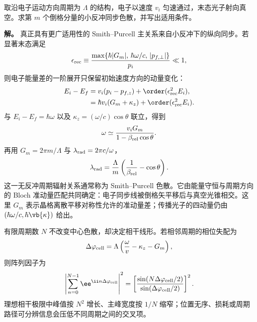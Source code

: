 \begin{exbox}
取沿电子运动方向周期为 $\Lambda$ 的结构，电子以速度 $v_i$ 匀速通过，末态光子射向真空。求第 $m$ 个倒格分量的小反冲同步色散，并写出适用条件。

\textbf{解。} 真正具有更广适用性的 Smith--Purcell 主关系来自小反冲下的纵向同步。若显著末态满足
\begin{equation*}
\epsilon_{\rm rec}\equiv
\frac{\max\{\hbar|G_m|,\,\hbar\omega/c,\,|p_{f,\perp}|\}}{p_i}\ll1,
\end{equation*}
则电子能量差的一阶展开只保留初始速度方向的动量变化：
\begin{align*}
E_i-E_f
&=v_i(p_i-p_{f,z})+\order(\epsilon_{\rm rec}^2E_i),\\
&=\hbar v_i(G_m+\kappa_z)+\order(\epsilon_{\rm rec}^2E_i).
\end{align*}
与 $E_i-E_f=\hbar\omega$ 以及 $\kappa_z=(\omega/c)\cos\theta$ 联立，得到
\begin{equation*}
\omega\simeq\frac{v_iG_m}{1-\beta_{\rm rel}\cos\theta}.
\end{equation*}
再用 $G_m=2\pi m/\Lambda$ 与 $\lambda_{\rm rad}=2\pi c/\omega$，
\begin{equation}
{
\lambda_{\rm rad}
=\frac{\Lambda}{m}
\left(\frac1{\beta_{\rm rel}}-\cos\theta\right).}
\label{eq:smith_purcell_wavelength}\end{equation}
这一无反冲周期辐射关系通常称为 Smith--Purcell 色散。它由能量守恒与周期方向的 Bloch 准动量匹配共同确定：电子同步线被倒格矢平移后与真空光锥相交。这里 $G_m$ 表示晶格离散平移对称性允许的准动量差；传播光子的四动量仍由 $(\hbar\omega/c,\hbar\vb{\kappa})$ 给出。
\end{exbox}



有限周期数 $N$ 不改变中心色散，却决定相干线形。若相邻周期的相位失配为
\begin{equation*}
\Delta\varphi_{\rm cell}=\Lambda\left(\frac{\omega}{v}-\kappa_z-G_m\right),
\end{equation*}
则阵列因子为
\begin{equation*}
\left|\sum_{n=0}^{N-1}\ee^{\ii n\Delta\varphi_{\rm cell}}\right|^2
=\left[\frac{\sin(N\Delta\varphi_{\rm cell}/2)}{\sin(\Delta\varphi_{\rm cell}/2)}\right]^2.
\end{equation*}
理想相干极限中峰值按 $N^2$ 增长、主峰宽度按 $1/N$ 缩窄；位置无序、损耗或周期路径可分辨信息会压低不同周期之间的交叉项。

